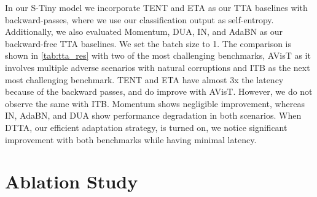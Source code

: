   In our S-Tiny model we incorporate TENT\cite{wang2020tent} and ETA\cite{niu2022efficient} as our TTA baselines with backward-passes,
  where we use our classification output as self-entropy. Additionally, we also evaluated Momentum\cite{schneider2020improving}, DUA\cite{mirza2022norm}, IN\cite{pan2018two}, and AdaBN\cite{li2016revisiting} as our backward-free TTA baselines. We set the batch size to 1. The comparison is shown in \ref{tab:tta_res} with two of the most challenging benchmarks, AVisT as it involves multiple adverse scenarios with natural corruptions and ITB as the next most challenging benchmark.
  TENT and ETA have almost 3x the latency because of the backward passes, and do improve with AVisT. However, we do not observe the same with ITB. Momentum shows negligible improvement, whereas IN, AdaBN, and DUA show performance degradation in both scenarios. When DTTA, our efficient adaptation strategy, is turned on, we notice significant improvement with both benchmarks while having minimal latency.
  \begin{table}[t]
	\caption{Case study on parameter-free dynamic updates. }
	\vspace{-3mm}
	\label{tab:component_ablation_updates}
	\centering
	\vspace{-5mm}
  \end{table}
  
  \section{Ablation Study}\label{sec:ablation}
  
